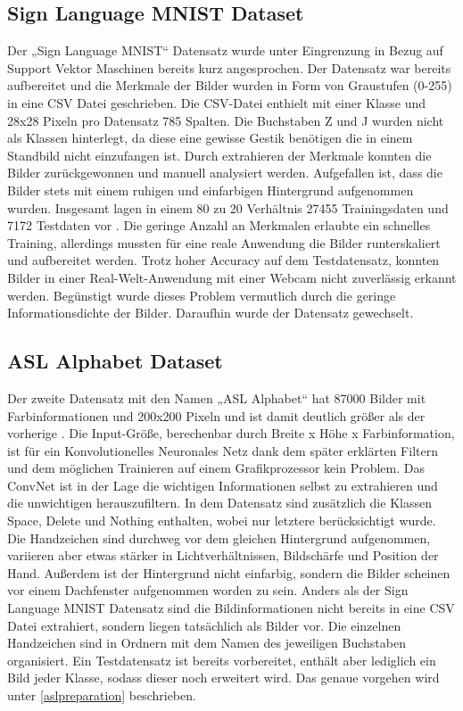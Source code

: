 \documentclass[11pt,bibliography=totocnumbered]{scrartcl}
\begin{document}
\subsection{Sign Language MNIST Dataset}
Der „Sign Language MNIST“ Datensatz wurde unter Eingrenzung in Bezug auf Support Vektor Maschinen bereits kurz angesprochen. Der Datensatz war bereits aufbereitet und die Merkmale der Bilder wurden in Form von Graustufen (0-255) in eine CSV Datei geschrieben. Die CSV-Datei enthielt mit einer Klasse und 28x28 Pixeln pro Datensatz 785 Spalten. Die Buchstaben Z und J wurden nicht als Klassen hinterlegt, da diese eine gewisse Gestik benötigen die in einem Standbild nicht einzufangen ist. Durch extrahieren der Merkmale konnten die Bilder zurückgewonnen und manuell analysiert werden. Aufgefallen ist, dass die Bilder stets mit einem ruhigen und einfarbigen Hintergrund aufgenommen wurden. Insgesamt lagen in einem 80 zu 20 Verhältnis 27455 Trainingsdaten und 7172 Testdaten vor \cite{SIGNMNIST}. Die geringe Anzahl an Merkmalen erlaubte ein schnelles Training, allerdings mussten für eine reale Anwendung die Bilder runterskaliert und aufbereitet werden. Trotz hoher Accuracy auf dem Testdatensatz, konnten Bilder in einer Real-Welt-Anwendung mit einer Webcam nicht zuverlässig erkannt werden. Begünstigt wurde dieses Problem vermutlich durch die geringe Informationsdichte der Bilder. Daraufhin wurde der Datensatz gewechselt. 
\subsection{ASL Alphabet Dataset}
Der zweite Datensatz mit den Namen „ASL Alphabet“ hat 87000 Bilder mit Farbinformationen und 200x200 Pixeln und ist damit deutlich größer als der vorherige \cite{ASLMNIST}. Die Input-Größe, berechenbar durch Breite x Höhe x Farbinformation, ist für ein Konvolutionelles Neuronales Netz dank dem später erklärten Filtern und dem möglichen Trainieren auf einem Grafikprozessor kein Problem. Das ConvNet ist in der Lage die wichtigen Informationen selbst zu extrahieren und die unwichtigen herauszufiltern. In dem Datensatz sind zusätzlich die Klassen Space, Delete und Nothing enthalten, wobei nur letztere berücksichtigt wurde. Die Handzeichen sind durchweg vor dem gleichen Hintergrund aufgenommen, variieren aber etwas stärker in Lichtverhältnissen, Bildschärfe und Position der Hand. Außerdem ist der Hintergrund nicht einfarbig, sondern die Bilder scheinen vor einem Dachfenster aufgenommen worden zu sein. Anders als der Sign Language MNIST Datensatz sind die Bildinformationen nicht bereits in eine CSV Datei extrahiert, sondern liegen tatsächlich als Bilder vor. Die einzelnen Handzeichen sind in Ordnern mit dem Namen des jeweiligen Buchstaben organisiert. Ein Testdatensatz ist bereits vorbereitet, enthält aber lediglich ein Bild jeder Klasse, sodass dieser noch erweitert wird. Das genaue vorgehen wird unter \ref{aslpreparation} beschrieben.
\end{document}
